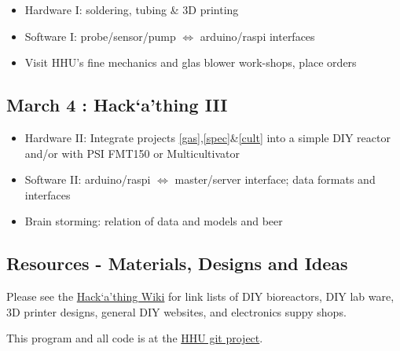 \documentclass[12pt,a4paper]{scrartcl}
\newcommand{\hack}[0]{Hack`a'thing}
\begin{document}

\begin{itemize}
\item Hardware I: soldering, tubing \& 3D printing
\item Software I: probe/sensor/pump $\Leftrightarrow$ arduino/raspi interfaces
\item Visit HHU's fine mechanics and glas blower work-shops, place
  orders
\end{itemize}

\subsection*{March 4 : \hack{} III}

\begin{itemize}
\item Hardware II: Integrate projects \ref{gas},\ref{spec}\&\ref{cult}
  into a simple DIY reactor and/or with PSI FMT150 or Multicultivator
\item Software II: arduino/raspi $\Leftrightarrow$  master/server interface; data formats and interfaces
\item Brain storming: relation of data and models and beer
\end{itemize}

\subsection{Resources - Materials, Designs and Ideas}

Please see the
\href{https://wiki.hhu.de/display/QTBP/1st+QTB+PBR+Hack\%60a'thing}{Hack`a'thing
  Wiki} for link lists of DIY bioreactors, DIY lab ware, 3D printer
designs, general DIY websites, and electronics suppy shops.

This program and all code is at the \href{https://git.hhu.de/machne/pbr_hackathon_201503/tree/master}{HHU git project}.
\end{document}
